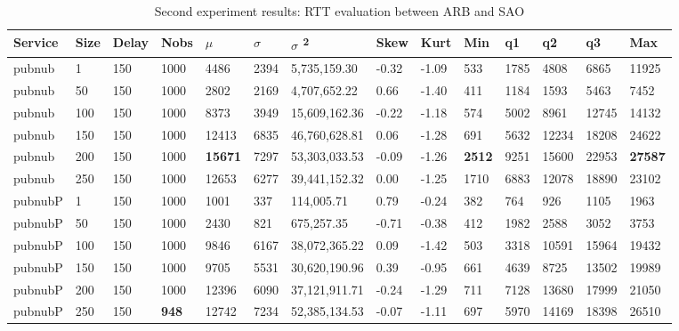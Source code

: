 \begin{table}[!htb]
	\footnotesize
	\centering
	\caption{Second experiment results: RTT evaluation between ARB and SAO}
	\label{tab:secondtrialarbsao}
	\begin{tabular}{llllllllllllll}
		Service    & Size & Delay & Nobs & $\mu$ & $\sigma$  & $\sigma$ \textsuperscript{2} & Skew & Kurt & Min & q1   & q2   & q3   & Max   \\ \midrule
		pubnub     & 1            & 150   & 1000 & 4486  & 2394 & 5,735,159.30  & -0.32    & -1.09    & 533  & 1785 & 4808  & 6865  & 11925 \\
		pubnub     & 50           & 150   & 1000 & 2802  & 2169 & 4,707,652.22  & 0.66     & -1.40    & 411  & 1184 & 1593  & 5463  & 7452  \\
		pubnub     & 100          & 150   & 1000 & 8373  & 3949 & 15,609,162.36 & -0.22    & -1.18    & 574  & 5002 & 8961  & 12745 & 14132 \\
		pubnub     & 150          & 150   & 1000 & 12413 & 6835 & 46,760,628.81 & 0.06     & -1.28    & 691  & 5632 & 12234 & 18208 & 24622 \\
		pubnub     & 200          & 150   & 1000 & \textbf{15671} & 7297 & 53,303,033.53 & -0.09    & -1.26    & \textbf{2512} & 9251 & 15600 & 22953 & \textbf{27587} \\
		pubnub     & 250          & 150   & 1000 & 12653 & 6277 & 39,441,152.32 & 0.00     & -1.25    & 1710 & 6883 & 12078 & 18890 & 23102 \\ \hline
		pubnubP & 1            & 150   & 1000 & 1001  & 337  & 114,005.71    & 0.79     & -0.24    & 382  & 764  & 926   & 1105  & 1963  \\
		pubnubP & 50           & 150   & 1000 & 2430  & 821  & 675,257.35    & -0.71    & -0.38    & 412  & 1982 & 2588  & 3052  & 3753  \\
		pubnubP & 100          & 150   & 1000 & 9846  & 6167 & 38,072,365.22 & 0.09     & -1.42    & 503  & 3318 & 10591 & 15964 & 19432 \\
		pubnubP & 150          & 150   & 1000 & 9705  & 5531 & 30,620,190.96 & 0.39     & -0.95    & 661  & 4639 & 8725  & 13502 & 19989 \\
		pubnubP & 200          & 150   & 1000 & 12396 & 6090 & 37,121,911.71 & -0.24    & -1.29    & 711  & 7128 & 13680 & 17999 & 21050 \\
		pubnubP & 250          & 150   & \textbf{948}  & 12742 & 7234 & 52,385,134.53 & -0.07    & -1.11    & 697  & 5970 & 14169 & 18398 & 26510 \\ \hline

\end{tabular}
\end{table}
